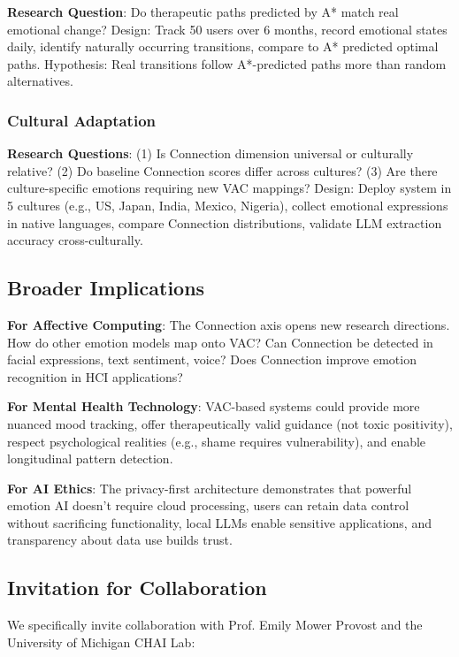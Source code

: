 \textbf{Research Question}: Do therapeutic paths predicted by A* match real emotional change? Design: Track 50 users over 6 months, record emotional states daily, identify naturally occurring transitions, compare to A* predicted optimal paths. Hypothesis: Real transitions follow A*-predicted paths more than random alternatives.

\subsubsection{Cultural Adaptation}

\textbf{Research Questions}: (1) Is Connection dimension universal or culturally relative? (2) Do baseline Connection scores differ across cultures? (3) Are there culture-specific emotions requiring new VAC mappings? Design: Deploy system in 5 cultures (e.g., US, Japan, India, Mexico, Nigeria), collect emotional expressions in native languages, compare Connection distributions, validate LLM extraction accuracy cross-culturally.

\subsection{Broader Implications}

\textbf{For Affective Computing}: The Connection axis opens new research directions. How do other emotion models map onto VAC? Can Connection be detected in facial expressions, text sentiment, voice? Does Connection improve emotion recognition in HCI applications?

\textbf{For Mental Health Technology}: VAC-based systems could provide more nuanced mood tracking, offer therapeutically valid guidance (not toxic positivity), respect psychological realities (e.g., shame requires vulnerability), and enable longitudinal pattern detection.

\textbf{For AI Ethics}: The privacy-first architecture demonstrates that powerful emotion AI doesn't require cloud processing, users can retain data control without sacrificing functionality, local LLMs enable sensitive applications, and transparency about data use builds trust.

\subsection{Invitation for Collaboration}

We specifically invite collaboration with Prof. Emily Mower Provost and the University of Michigan CHAI Lab:

